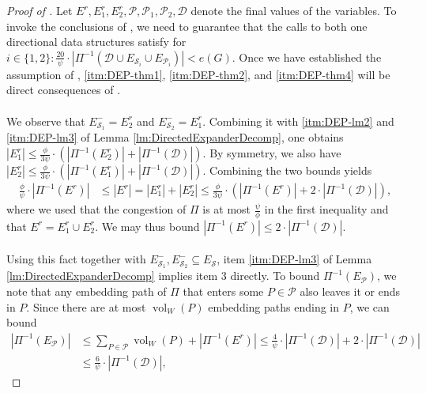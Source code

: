 \documentclass[11pt]{article}
\DeclareMathOperator{\vol}{vol}
\begin{document}
\begin{proof}[Proof of ]
    Let $E^r, E^r_1, E^r_2, \mathcal{P}, \mathcal{P}_1, \mathcal{P}_2, \mathcal{D}$ denote the final values of the variables. To invoke the conclusions of , we need to guarantee that the calls to both one directional data structures satisfy for $i \in \{1,2\}: \frac{20}{\psi} \cdot |\Pi^{-1}(\mathcal{D} \cup E_{\mathcal{S}_i} \cup E_{\mathcal{P}_i})| < e(G)$. Once we have established the assumption of , \cref{itm:DEP-thm1}, \ref{itm:DEP-thm2}, and \ref{itm:DEP-thm4} will be direct consequences of .\\
    \\
    We observe that $E_{\mathcal{S}_1}^- = E^r_2$ and $E_{\mathcal{S}_2}^- = E^r_1$. Combining it with \cref{itm:DEP-lm2} and \cref{itm:DEP-lm3} of Lemma \ref{lm:DirectedExpanderDecomp}, one obtains $|E^r_1| \leq \frac{\phi}{3\psi} \cdot \left(|\Pi^{-1}(E_2^r)| + |\Pi^{-1}(\mathcal{D})| \right).$ By symmetry, we also have $|E^r_2| \leq \frac{\phi}{3\psi} \cdot \left(|\Pi^{-1}(E_1^r)| + |\Pi^{-1}(\mathcal{D})| \right)$. Combining the two bounds yields
    \begin{align}\label{proof-biDEP}
        \frac{\phi}{\psi} \cdot |\Pi^{-1}(E^r)| &\leq |E^r| = |E^r_1| + |E^r_2| \leq \frac{\phi}{3 \psi} \cdot \left(|\Pi^{-1}(E^r)| + 2 \cdot |\Pi^{-1}(\mathcal{D})| \right),
    \end{align}
    where we used that the congestion of $\Pi$ is at most $\frac{\psi}{\phi}$ in the first inequality and that $E^r = E^r_1 \cup E^r_2$. We may thus bound $|\Pi^{-1}(E^r)| \leq 2 \cdot |\Pi^{-1}(\mathcal{D})|$.\\
    \\
    Using this fact together with $E_{\mathcal{S}_1}^-, E_{\mathcal{S}_2}^- \subseteq E_{\mathcal{S}}$, item \ref{itm:DEP-lm3} of Lemma \ref{lm:DirectedExpanderDecomp} implies item 3 directly. To bound $\Pi^{-1}(E_{\mathcal{P}})$, we note that any embedding path of $\Pi$ that enters some $P \in \mathcal{P}$ also leaves it or ends in $P$. Since there are at most $\vol_W(P)$ embedding paths ending in $P$, we can bound 
    \begin{align*}
        |\Pi^{-1}(E_{\mathcal{P}})| &\leq \sum_{P \in \mathcal{P}} \vol_W(P) + |\Pi^{-1}(E^r)| \leq \frac{4}{\psi} \cdot |\Pi^{-1}(\mathcal{D})| + 2 \cdot |\Pi^{-1}(\mathcal{D})| \\
        &\leq \frac{6}{\psi} \cdot |\Pi^{-1}(\mathcal{D})|,

\end{align*}
\end{proof}
\end{document}
